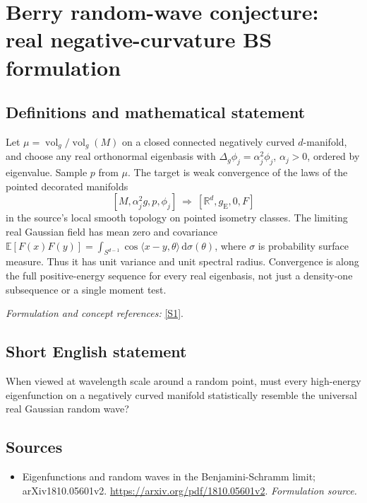 \documentclass[11pt]{article}
\begin{document}
\section*{\texorpdfstring{Berry random-wave conjecture: real negative-curvature BS formulation}{Berry random-wave conjecture: real negative-curvature BS formulation}}\label{229}
\subsection{Definitions and mathematical statement}
Let $\mu=\operatorname{vol}_g/\operatorname{vol}_g(M)$ on a closed connected negatively curved $d$-manifold, and choose any real orthonormal eigenbasis with
$\Delta_g\phi_j=\alpha_j^2\phi_j$, $\alpha_j>0$, ordered by eigenvalue. Sample $p$ from $\mu$. The target is weak convergence of the laws of the pointed decorated manifolds
\[
 [M,\alpha_j^2g,p,\phi_j]\ \Longrightarrow\ [{\mathbb{R}}^d,g_{\mathrm E},0,F]
\]
in the source's local smooth topology on pointed isometry classes. The limiting real Gaussian field has mean zero and covariance
${\mathbb{E}}[F(x)F(y)]=\int_{S^{d-1}}\cos\langle x-y,\theta\rangle{\,\mathrm{d}}\sigma(\theta)$,
where $\sigma$ is probability surface measure. Thus it has unit variance and unit spectral radius. Convergence is along the full positive-energy sequence for every real eigenbasis, not just a density-one subsequence or a single moment test.
\par\smallskip\textit{Formulation and concept references:} \href{https://arxiv.org/pdf/1810.05601v2}{[S1]}.

\subsection{Short English statement}
When viewed at wavelength scale around a random point, must every high-energy eigenfunction on a negatively curved manifold statistically resemble the universal real Gaussian random wave?
\subsection{Sources}
\begin{itemize}
\item[S1]Eigenfunctions and random waves in the Benjamini-Schramm limit; arXiv1810.05601v2.
\url{https://arxiv.org/pdf/1810.05601v2}.
\textit{Formulation source.}
\end{itemize}
\end{document}
